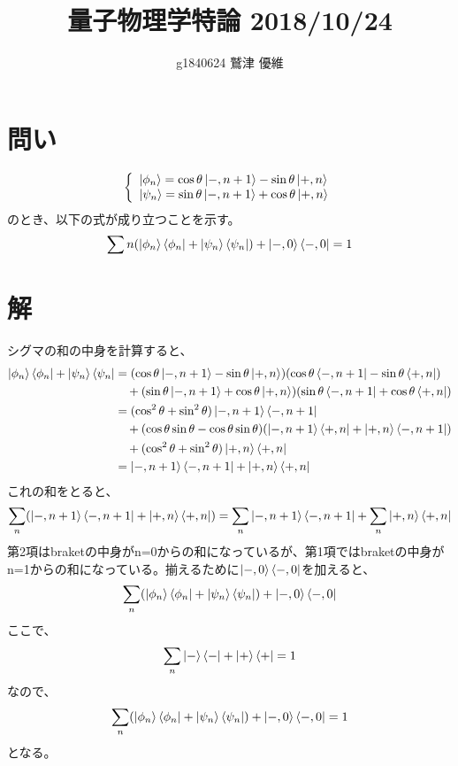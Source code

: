 \documentclass[10pt]{ujarticle}
\title{量子物理学特論 2018/10/24}
\author{g1840624 鷲津 優維}
\date{}
\begin{document}
\maketitle
\section{問い}
\[
\left\{
\begin{array}{l}
  \ket{\phi_n} = \cos\theta \ket{-, n+1} - \sin\theta \ket{+, n}\\
  \ket{\psi_n} = \sin\theta \ket{-, n+1} + \cos\theta \ket{+, n}
  \end{array}
\right.
\]
のとき、以下の式が成り立つことを示す。
\begin{eqnarray*}
\sum{n} (\ket{\phi_n} \bra{\phi_n} +\ket{\psi_n} \bra{\psi_n}) + \ket{-, 0} \bra{-, 0} = 1
\end{eqnarray*}

\section{解}
シグマの和の中身を計算すると、
\begin{eqnarray*}
\begin{split}
\ket{\phi_n} \bra{\phi_n} +\ket{\psi_n} \bra{\psi_n} &= (\cos\theta \ket{-, n+1} - \sin\theta \ket{+, n})(\cos\theta \bra{-, n+1} - \sin\theta \bra{+, n}) \\
&\quad+ (\sin\theta \ket{-, n+1} + \cos\theta \ket{+, n})(\sin\theta \bra{-, n+1} + \cos\theta \bra{+, n}) \\
&= (\cos^2\theta + \sin^2\theta) \ket{-, n+1} \bra{-, n+1} \\
&\quad + (\cos\theta\sin\theta-\cos\theta\sin\theta)(\ket{-, n+1}\bra{+, n} + \ket{+, n} \bra{-, n+1}) \\
&\quad + (\cos^2\theta + \sin^2\theta) \ket{+, n} \bra{+, n} \\
&= \ket{-, n+1} \bra{-, n+1} + \ket{+, n} \bra{+, n}
\end{split}
\end{eqnarray*}
これの和をとると、
\begin{eqnarray*}
\sum_{n} (\ket{-, n+1} \bra{-, n+1} + \ket{+, n} \bra{+, n}) = \sum_{n} \ket{-, n+1} \bra{-, n+1} + \sum_{n} \ket{+, n} \bra{+, n}
\end{eqnarray*}
第2項はbraketの中身がn=0からの和になっているが、第1項ではbraketの中身がn=1からの和になっている。揃えるために$\ket{-, 0} \bra{-, 0}$を加えると、
\begin{eqnarray*}
\sum_{n} (\ket{\phi_n} \bra{\phi_n} +\ket{\psi_n} \bra{\psi_n}) + \ket{-, 0} \bra{-, 0} 
\end{eqnarray*}
ここで、
\begin{eqnarray*}
\sum_{n} \ket{-} \bra{-} + \ket{+} \bra{+} = 1
\end{eqnarray*}
なので、
\begin{eqnarray*}
\sum_{n} (\ket{\phi_n} \bra{\phi_n} +\ket{\psi_n} \bra{\psi_n}) + \ket{-, 0} \bra{-, 0} = 1
\end{eqnarray*}
となる。
\end{document}
